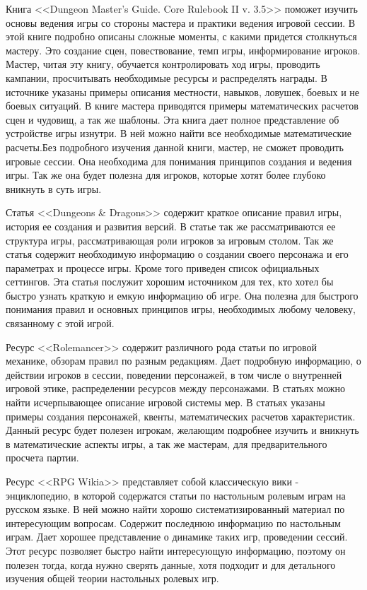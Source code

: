 Книга <<Dungeon Master's Guide. Core Rulebook II v. 3.5>> поможет изучить основы ведения игры со стороны мастера и практики ведения игровой сессии. В этой книге подробно описаны сложные моменты, с какими придется столкнуться мастеру. Это создание сцен, повествование, темп игры, информирование игроков. Мастер, читая эту книгу, обучается контролировать ход игры, проводить кампании, просчитывать необходимые ресурсы и распределять награды. В источнике указаны примеры описания местности, навыков, ловушек, боевых и не боевых ситуаций. В книге мастера приводятся примеры математических расчетов сцен и чудовищ, а так же шаблоны. Эта книга дает полное представление об устройстве игры изнутри. В ней можно найти все необходимые математические расчеты.Без подробного изучения данной книги, мастер, не сможет проводить игровые сессии. Она необходима для понимания принципов создания и ведения игры. Так же она будет полезна для игроков, которые хотят более глубоко вникнуть в суть игры.

Статья <<Dungeons \& Dragons>> содержит краткое описание правил игры, история ее создания и развития версий. В статье так же рассматриваются ее структура игры, рассматривающая роли игроков за игровым столом. Так же статья содержит необходимую информацию о создании своего персонажа и его параметрах и процессе игры. Кроме того приведен список официальных сеттингов. Эта статья послужит хорошим источником для тех, кто хотел бы быстро узнать краткую и емкую информацию об игре. Она полезна для быстрого понимания правил и основных принципов игры, необходимых любому человеку, связанному с этой игрой.

Ресурс <<Rolemancer>> содержит различного рода статьи по игровой механике, обзорам правил по разным редакциям. Дает подробную информацию, о действии игроков в сессии, поведении персонажей, в том числе о внутренней игровой этике, распределении ресурсов между персонажами. В статьях можно найти исчерпывающее описание игровой системы мер. В статьях указаны примеры создания персонажей, квенты, математических расчетов характеристик. Данный ресурс будет полезен игрокам, желающим подробнее изучить и вникнуть в математические аспекты игры, а так же мастерам, для предварительного просчета партии.

Ресурс <<RPG Wikia>> представляет собой классическую вики - энциклопедию, в которой содержатся статьи по настольным ролевым играм на русском языке. В ней можно найти хорошо систематизированный материал по интересующим вопросам. Содержит последнюю информацию по настольным играм. Дает хорошее представление о динамике таких игр, проведении сессий. Этот ресурс позволяет быстро найти интересующую информацию, поэтому он полезен тогда, когда нужно сверять данные, хотя подходит и для детального изучения общей теории настольных ролевых игр.

\pagebreak
